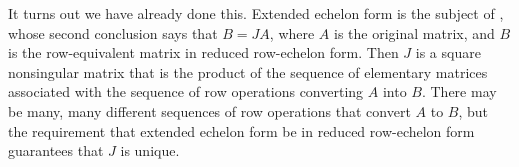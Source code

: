 %
It turns out we have already done this.  Extended echelon form is the subject of , whose second conclusion says that $B=JA$, where $A$ is the original matrix, and $B$ is the row-equivalent matrix in reduced row-echelon form.  Then $J$ is a square nonsingular matrix that is the product of the sequence of elementary matrices associated with the sequence of row operations converting $A$ into $B$.  There may be many, many different sequences of row operations that convert $A$ to $B$, but the requirement that extended echelon form be in reduced row-echelon form guarantees that $J$ is unique.
%
\begin{sageverbatim}
\end{sageverbatim}
%
